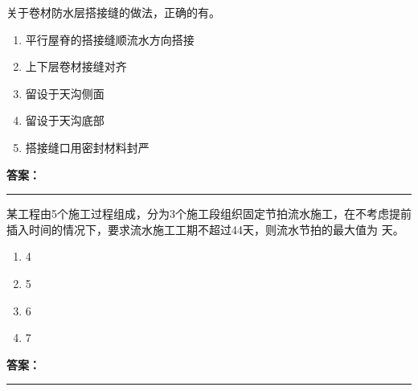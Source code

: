 \documentclass[UTF8,fontset=fandol,11pt]{ctexart}
\newcommand{\answerline}{\textcolor{answerred}{\rule{2.4cm}{0.7pt}}}
\begin{document}
\begin{quizbox}[title={乱序第 27 题｜第九章防水工程}]

关于卷材防水层搭接缝的做法，正确的有。\\

\begin{enumerate}[label=\Alph*.]

\item 平行屋脊的搭接缝顺流水方向搭接

\item 上下层卷材接缝对齐

\item 留设于天沟侧面

\item 留设于天沟底部

\item 搭接缝口用密封材料封严

\end{enumerate}

\textbf{\textcolor{answerred}{答案：}} \answerline

\end{quizbox}

\vspace{0.2em}

\begin{quizbox}[title={乱序第 28 题｜第十章流水施工原理}]

某工程由5个施工过程组成，分为3个施工段组织固定节拍流水施工，在不考虑提前插入时间的情况下，要求流水施工工期不超过44天，则流水节拍的最大值为 天。\\

\begin{enumerate}[label=\Alph*.]

\item 4

\item 5

\item 6

\item 7

\end{enumerate}

\textbf{\textcolor{answerred}{答案：}} \answerline

\end{quizbox}

\vspace{0.2em}
\end{document}
